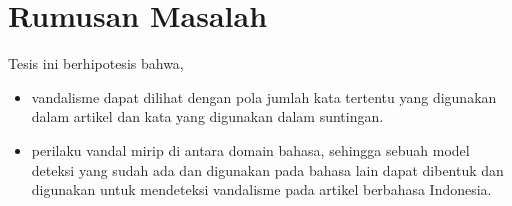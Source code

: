 \section{Rumusan Masalah}\label{sec:rumusan-masalah}

Tesis ini berhipotesis bahwa,
\begin{itemize}
	\item vandalisme dapat dilihat dengan pola jumlah kata tertentu yang digunakan dalam artikel dan kata yang digunakan dalam suntingan.
	\item perilaku vandal mirip di antara domain bahasa, sehingga sebuah model deteksi yang sudah ada dan digunakan pada bahasa lain dapat dibentuk dan digunakan untuk mendeteksi vandalisme pada artikel berbahasa Indonesia.
\end{itemize}